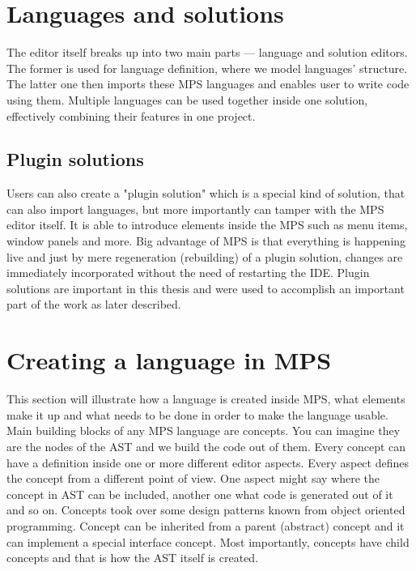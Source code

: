 \section{Languages and solutions}

The editor itself breaks up into two main parts --- language and solution editors.
The former is used for language definition, where we model languages' structure.
The latter one then imports these MPS languages and enables user to write code using them.
Multiple languages can be used together inside one solution, effectively combining their features in one project.

\subsection{Plugin solutions}

Users can also create a "plugin solution" which is a special kind of solution, that can also import languages, but more importantly can tamper with the MPS editor itself.
It is able to introduce elements inside the MPS such as menu items, window panels and more.
Big advantage of MPS is that everything is happening live and just by mere regeneration (rebuilding) of a plugin solution, changes are immediately incorporated without the need of restarting the IDE.
Plugin solutions are important in this thesis and were used to accomplish an important part of the work as later described.

\section{Creating a language in MPS}

This section will illustrate how a language is created inside MPS, what elements make it up and what needs to be done in order to make the language usable.
\\

Main building blocks of any MPS language are concepts.
You can imagine they are the nodes of the AST and we build the code out of them.
Every concept can have a definition inside one or more different editor aspects.
Every aspect defines the concept from a different point of view.
One aspect might say where the concept in AST can be included, another one what code is generated out of it and so on.
Concepts took over some design patterns known from object oriented programming.
Concept can be inherited from a parent (abstract) concept and it can implement a special interface concept.
Most importantly, concepts have child concepts and that is how the AST itself is created.
\\

